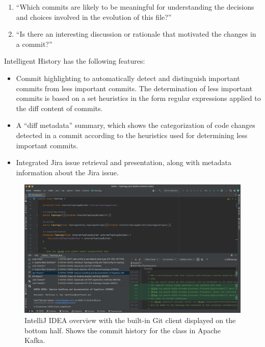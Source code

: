\begin{enumerate}
    \item ``Which commits are likely to be meaningful for understanding the decisions and choices involved in the evolution of this file?''
    \item ``Is there an interesting discussion or rationale that motivated the changes in a commit?''
\end{enumerate}

Intelligent History has the following features:

\begin{itemize}
    \item Commit highlighting to automatically detect and distinguish important commits from less important commits. The determination of less important commits is based on a set heuristics in the form regular expressions applied to the diff content of commits.
    \item A ``diff metadata'' summary, which shows the categorization of code changes detected in a commit according to the heuristics used for determining less important commits.
    \item Integrated Jira issue retrieval and presentation, along with metadata information about the Jira issue.
\end{itemize}

\begin{figure}
    \includegraphics[width=\textwidth]{./images/intellij-overview.png}
    \caption{
        IntelliJ IDEA overview with the built-in Git client displayed on the bottom half. Shows the commit history for the  class in Apache Kafka.
    }
    \label{fig:IntelliJ-Overview}
\end{figure}

